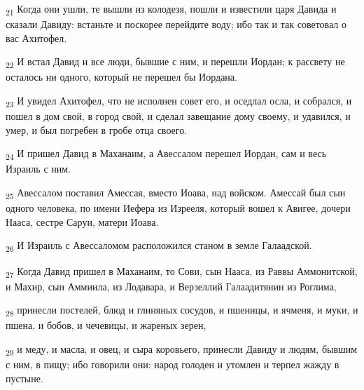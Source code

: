\begin{tcolorbox}
\textsubscript{21} Когда они ушли, те вышли из колодезя, пошли и известили царя Давида и сказали Давиду: встаньте и поскорее перейдите воду; ибо так и так советовал о вас Ахитофел.
\end{tcolorbox}
\begin{tcolorbox}
\textsubscript{22} И встал Давид и все люди, бывшие с ним, и перешли Иордан; к рассвету не осталось ни одного, который не перешел бы Иордана.
\end{tcolorbox}
\begin{tcolorbox}
\textsubscript{23} И увидел Ахитофел, что не исполнен совет его, и оседлал осла, и собрался, и пошел в дом свой, в город свой, и сделал завещание дому своему, и удавился, и умер, и был погребен в гробе отца своего.
\end{tcolorbox}
\begin{tcolorbox}
\textsubscript{24} И пришел Давид в Маханаим, а Авессалом перешел Иордан, сам и весь Израиль с ним.
\end{tcolorbox}
\begin{tcolorbox}
\textsubscript{25} Авессалом поставил Амессая, вместо Иоава, над войском. Амессай был сын одного человека, по имени Иефера из Изрееля, который вошел к Авигее, дочери Нааса, сестре Саруи, матери Иоава.
\end{tcolorbox}
\begin{tcolorbox}
\textsubscript{26} И Израиль с Авессаломом расположился станом в земле Галаадской.
\end{tcolorbox}
\begin{tcolorbox}
\textsubscript{27} Когда Давид пришел в Маханаим, то Сови, сын Нааса, из Раввы Аммонитской, и Махир, сын Аммиила, из Лодавара, и Верзеллий Галаадитянин из Роглима,
\end{tcolorbox}
\begin{tcolorbox}
\textsubscript{28} принесли постелей, блюд и глиняных сосудов, и пшеницы, и ячменя, и муки, и пшена, и бобов, и чечевицы, и жареных зерен,
\end{tcolorbox}
\begin{tcolorbox}
\textsubscript{29} и меду, и масла, и овец, и сыра коровьего, принесли Давиду и людям, бывшим с ним, в пищу; ибо говорили они: народ голоден и утомлен и терпел жажду в пустыне.
\end{tcolorbox}
